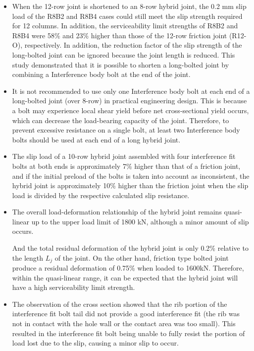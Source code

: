 \begin{itemize}

\item When the 12-row joint is shortened to an 8-row hybrid joint, the 0.2 mm slip load of the R8B2 and R8B4 cases could still meet the slip strength required for 12 columns. In addition, the serviceability limit strengths of R8B2 and R8B4 were 58\% and 23\% higher than those of the 12-row friction joint (R12-O), respectively. In addition, the reduction factor of the slip strength of the long-bolted joint can be ignored because the joint length is reduced. This study demonstrated that it is possible to shorten a long-bolted joint by combining a Interference body bolt at the end of the joint. 

\item It is not recommended to use only one Interference body bolt at each end of a long-bolted joint (over 8-row) in practical engineering design. This is because a bolt may experience local shear yield before net cross-sectional yield occurs, which can decrease the load-bearing capacity of the joint. Therefore, to prevent excessive resistance on a single bolt, at least two Interference body bolts should be used at each end of a long hybrid joint.

\item The slip load of a 10-row hybrid joint assembled with four interference fit bolts at both ends is approximately 7\% higher than that of a friction joint, and if the initial preload of the bolts is taken into account as inconsistent, the hybrid joint is approximately 10\% higher than the friction joint when the slip load is divided by the respective calculated slip resistance.

\item The overall load-deformation relationship of the hybrid joint remains quasi-linear up to the upper load limit of 1800 kN, although a minor amount of slip occurs. 

And the total residual deformation of the hybrid joint is only 0.2\% relative to the length $L_j$ of the joint. On the other hand, friction type bolted joint produce a residual deformation of 0.75\% when loaded to 1600kN. Therefore, within the quasi-linear range, it can be expected that the hybrid joint will have a high serviceability limit strength.

\item The observation of the cross section showed that the rib portion of the interference fit bolt tail did not provide a good interference fit (the rib was not in contact with the hole wall or the contact area was too small). This resulted in the interference fit bolt being unable to fully resist the portion of load lost due to the slip, causing a minor slip to occur. 


\end{itemize}

